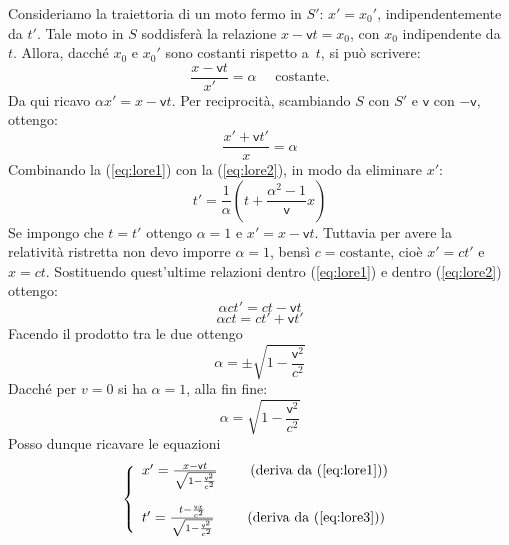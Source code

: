 Consideriamo la traiettoria di un moto fermo in $S'$: $x'=x_{0}'$,
indipendentemente da $t'$. Tale moto in $S$ soddisfer\`a la relazione
$x-\mathsf{v}t=x_{0}$, con $x_{0}$ indipendente da~$t$.  Allora,
dacch\'e $x_{0}$ e $x_{0}'$ sono costanti rispetto a~$t$, si pu\`o
scrivere:
\begin{equation}
  \frac{x-\mathsf{v}t}{x'}=\alpha \quad\mbox{ costante.}
  \label{eq:lore1}
\end{equation}
Da qui ricavo $\alpha x'=x-\mathsf{v}t$. Per reciprocit\`a, scambiando
$S$ con $S'$ e $\mathsf{v}$ con $-\mathsf{v}$, ottengo:
\begin{equation}
  \frac{x'+\mathsf{v}t'}{x}=\alpha \label{eq:lore2}
\end{equation}
Combinando la (\ref{eq:lore1}) con la (\ref{eq:lore2}), in modo da
eliminare $x'$:
\begin{equation}
  t'=\frac{1}{\alpha}\left(t+\frac{\alpha^2-1}{\mathsf{v}}x\right)
  \label{eq:lore3}
\end{equation}
Se impongo che $t=t'$ ottengo $\alpha=1$ e $x'=x-\mathsf{v}t$.
Tuttavia per avere la relativit\`a ristretta non devo imporre
$\alpha=1$, bens\`i $c=\mathrm{costante}$, cio\`e $x'=ct'$ e
$x=ct$. Sostituendo quest'ultime relazioni dentro (\ref{eq:lore1}) e
dentro (\ref{eq:lore2}) ottengo:
\begin{displaymath}
  \alpha c t'=ct-\mathsf{v}t
\end{displaymath}
\begin{displaymath}
  \alpha ct=ct'+\mathsf{v}t'
\end{displaymath}
Facendo il prodotto tra le due ottengo
\begin{displaymath}
  \alpha=\pm \sqrt{1-\frac{\mathsf{v}^2}{c^2}}
\end{displaymath}
Dacch\'e per $v=0$ si ha $\alpha=1$, alla fin fine:
\begin{displaymath}
  \alpha=\sqrt{1-\frac{\mathsf{v}^2}{c^2}}
\end{displaymath}
Posso dunque ricavare le equazioni
\begin{displaymath}
  \left\{\begin{array}{l}
      x'=\frac{x-\mathsf{v}t}{\sqrt{1-\frac{\mathsf{v}^2}{c^2}}}\qquad
      \mbox{
        (deriva da (\ref{eq:lore1}))}\\
      \mbox{ }\\
      t'=\frac{t-\frac{\mathsf{v}x}{c^{2}}}{\sqrt{1-\frac{\mathsf{v}^2}{c^2}}}
      \qquad\mbox{ (deriva da (\ref{eq:lore3}))}
    \end{array}\right.
\end{displaymath}
